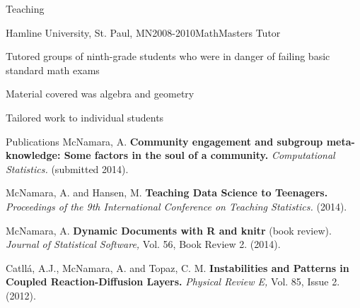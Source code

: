 \documentclass{resume} %
\begin{document}
\begin{rSection}{Teaching}
\begin{rSubsection}{Hamline University, }{St. Paul, MN}{2008-2010}{MathMasters Tutor}
\item Tutored groups of ninth-grade students who were in danger of failing basic standard math exams
\item Material covered was algebra and geometry
\item Tailored work to individual students
\end{rSubsection}

\end{rSection}



\begin{rSection}{Publications}
McNamara, A. {\bf Community engagement and subgroup meta-knowledge: Some factors in the soul of a community.} { \em Computational Statistics.} (submitted 2014).

McNamara, A. and Hansen, M. {\bf Teaching Data Science to Teenagers.}{ \em Proceedings of the 9th International Conference on Teaching Statistics.} (2014). 

McNamara, A. {\bf Dynamic Documents with R and knitr} (book review). {\em Journal of Statistical Software,}{ Vol. 56, Book Review 2.} (2014).

{Catll{\'a}, A.J., McNamara, A. and Topaz, C. M.} {\bf Instabilities and Patterns in Coupled Reaction-Diffusion Layers.} {\em Physical Review E,} Vol. 85, Issue 2. (2012). 

\end{rSection}

\end{document}
